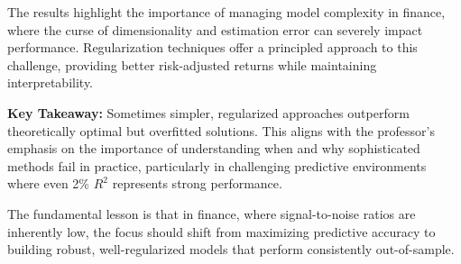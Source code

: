 \documentclass[12pt]{article}
\begin{document}
The results highlight the importance of managing model complexity in finance, where the curse of dimensionality and estimation error can severely impact performance. Regularization techniques offer a principled approach to this challenge, providing better risk-adjusted returns while maintaining interpretability.

\textbf{Key Takeaway:} Sometimes simpler, regularized approaches outperform theoretically optimal but overfitted solutions. This aligns with the professor's emphasis on the importance of understanding when and why sophisticated methods fail in practice, particularly in challenging predictive environments where even 2\% $R^2$ represents strong performance.

The fundamental lesson is that in finance, where signal-to-noise ratios are inherently low, the focus should shift from maximizing predictive accuracy to building robust, well-regularized models that perform consistently out-of-sample.
\end{document}
